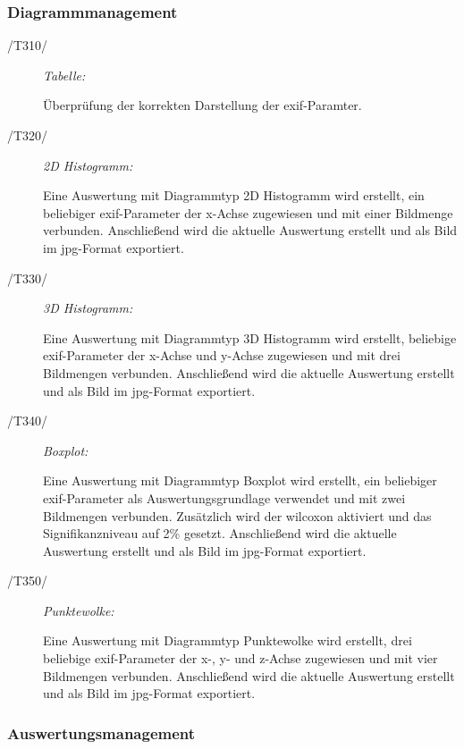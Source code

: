 	\subsubsection{Diagrammmanagement}
	
		\begin{description}
			
			\item[/T310/] \textit{Tabelle:}\par Überprüfung der korrekten Darstellung der \gls{exif}-Paramter. 

			\item[/T320/] \textit{2D Histogramm:}\par	Eine Auswertung mit Diagrammtyp 2D Histogramm wird erstellt, ein beliebiger \gls{exif}-Parameter der x-Achse zugewiesen und mit einer Bildmenge verbunden. Anschließend wird die aktuelle Auswertung erstellt und als Bild im \gls{jpg}-Format exportiert.
		
			\item[/T330/] \textit{3D Histogramm:}\par Eine Auswertung mit Diagrammtyp 3D Histogramm wird erstellt, beliebige \gls{exif}-Parameter der x-Achse und y-Achse zugewiesen und mit drei Bildmengen verbunden. Anschließend wird die aktuelle Auswertung erstellt und als Bild im \gls{jpg}-Format exportiert.

			\item[/T340/] \textit{Boxplot:}\par Eine Auswertung mit Diagrammtyp Boxplot wird erstellt, ein beliebiger \gls{exif}-Parameter als Auswertungsgrundlage verwendet und mit zwei Bildmengen verbunden. Zusätzlich wird der \gls{wilcoxon} aktiviert und das Signifikanzniveau auf 2\% gesetzt. Anschließend wird die aktuelle Auswertung erstellt und als Bild im \gls{jpg}-Format exportiert.

			\item[/T350/] \textit{Punktewolke:}\par	Eine Auswertung mit Diagrammtyp Punktewolke wird erstellt, drei beliebige \gls{exif}-Parameter der x-, y- und z-Achse zugewiesen und mit vier Bildmengen verbunden. Anschließend wird die aktuelle Auswertung erstellt und als Bild im \gls{jpg}-Format exportiert.

		\end{description}
	
	\subsubsection{Auswertungsmanagement}


